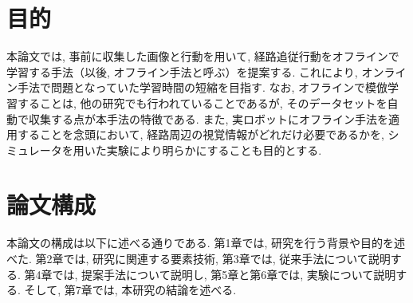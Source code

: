 \newpage
\section{目的}
本論文では, 事前に収集した画像と行動を用いて, 経路追従行動をオフラインで学習する手法（以後, オフライン手法と呼ぶ）を提案する. これにより, オンライン手法で問題となっていた学習時間の短縮を目指す. なお, オフラインで模倣学習することは, 他の研究でも行われていることであるが, そのデータセットを自動で収集する点が本手法の特徴である. また, 実ロボットにオフライン手法を適用することを念頭において, 経路周辺の視覚情報がどれだけ必要であるかを, シミュレータを用いた実験により明らかにすることも目的とする.
\section{論文構成}
本論文の構成は以下に述べる通りである. 第1章では, 研究を行う背景や目的を述べた. 第2章では, 研究に関連する要素技術, 第3章では, 従来手法について説明する. 第4章では, 提案手法について説明し, 第5章と第6章では, 実験について説明する. そして, 第7章では, 本研究の結論を述べる. 
     

